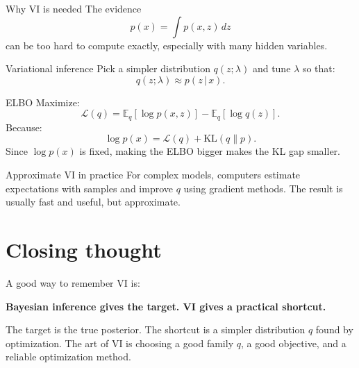\documentclass[11pt]{article}
\newcommand{\E}{\mathbb{E}}
\newcommand{\KL}{\mathrm{KL}}
\newcommand{\given}{\,|\,}
\begin{document}
\begin{idea}{Why VI is needed}
The evidence
\[
p(x)=\int p(x,z)\,dz
\]
can be too hard to compute exactly, especially with many hidden variables.
\end{idea}

\begin{idea}{Variational inference}
Pick a simpler distribution $q(z;\lambda)$ and tune $\lambda$ so that:
\[
q(z;\lambda) \approx p(z\given x).
\]
\end{idea}

\begin{idea}{ELBO}
Maximize:
\[
\mathcal{L}(q)=\E_q[\log p(x,z)]-\E_q[\log q(z)].
\]
Because:
\[
\log p(x)=\mathcal{L}(q)+\KL(q\|p).
\]
Since $\log p(x)$ is fixed, making the ELBO bigger makes the KL gap smaller.
\end{idea}

\begin{idea}{Approximate VI in practice}
For complex models, computers estimate expectations with samples and improve $q$ using gradient methods. The result is usually fast and useful, but approximate.
\end{idea}

\section*{Closing thought}

A good way to remember VI is:

\begin{center}
\Large
\textbf{Bayesian inference gives the target. VI gives a practical shortcut.}
\end{center}

The target is the true posterior. The shortcut is a simpler distribution $q$ found by optimization. The art of VI is choosing a good family $q$, a good objective, and a reliable optimization method.
\end{document}
